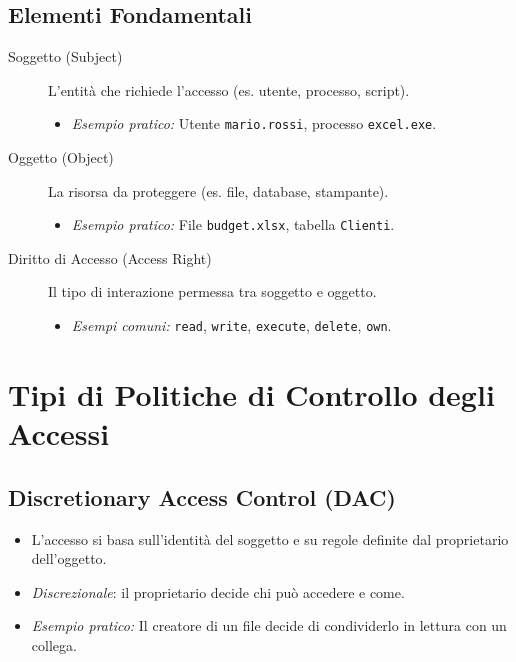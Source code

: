 \subsection{Elementi Fondamentali}
\begin{description}
    \item[Soggetto (Subject)] L'entità che richiede l'accesso (es. utente, processo, script).
        \begin{itemize}
            \item \textit{Esempio pratico:} Utente \texttt{mario.rossi}, processo \texttt{excel.exe}.
        \end{itemize}
    \item[Oggetto (Object)] La risorsa da proteggere (es. file, database, stampante).
        \begin{itemize}
            \item \textit{Esempio pratico:} File \texttt{budget.xlsx}, tabella \texttt{Clienti}.
        \end{itemize}
    \item[Diritto di Accesso (Access Right)] Il tipo di interazione permessa tra soggetto e oggetto.
        \begin{itemize}
            \item \textit{Esempi comuni:} \texttt{read}, \texttt{write}, \texttt{execute}, \texttt{delete}, \texttt{own}.
        \end{itemize}
\end{description}

\section{Tipi di Politiche di Controllo degli Accessi}

\subsection{Discretionary Access Control (DAC)}
\begin{itemize}
    \item L'accesso si basa sull'identità del soggetto e su regole definite dal proprietario dell'oggetto.
    \item \textit{Discrezionale}: il proprietario decide chi può accedere e come.
    \item \textit{Esempio pratico:} Il creatore di un file decide di condividerlo in lettura con un collega.
\end{itemize}

